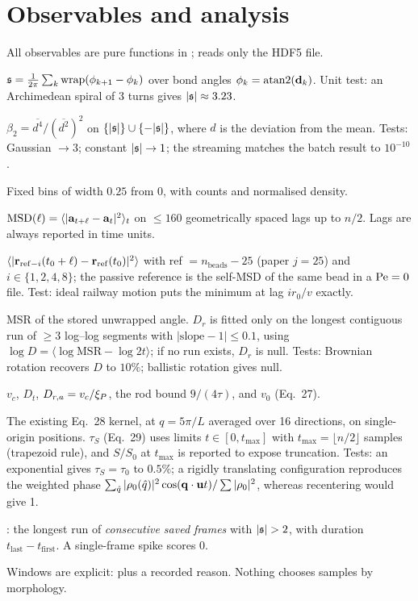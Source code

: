 \documentclass[11pt]{article}
\begin{document}
\section{Observables and analysis}\label{sec:observables}
All observables are pure functions in ;  reads only the HDF5 file.
\begin{description}[style=nextline]
\item[Spiral number] $\mathfrak{s}=\frac1{2\pi}\sum_k\mathrm{wrap}(\phi_{k+1}-\phi_k)$ over bond angles $\phi_k=\operatorname{atan2}(\mathbf{d}_k)$. Unit test: an Archimedean spiral of 3 turns gives $|\mathfrak{s}|\approx3.23$.
\item[Symmetrized kurtosis] $\beta_2=\overline{d^4}/(\overline{d^2})^2$ on $\{|\mathfrak{s}|\}\cup\{-|\mathfrak{s}|\}$, where $d$ is the deviation from the mean. Tests: Gaussian $\to3$; constant $|\mathfrak{s}|\to1$; the streaming  matches the batch result to $10^{-10}$.
\item[$|\spn|$ histogram] Fixed bins of width $0.25$ from 0, with counts and normalised density.
\item[Multi-origin MSD] $\mathrm{MSD}(\ell)=\langle|\mathbf{a}_{t+\ell}-\mathbf{a}_t|^2\rangle_t$ on $\leq160$ geometrically spaced lags up to $n/2$. Lags are always reported in time units.
\item[Railway MSD] $\langle|\mathbf{r}_{\mathrm{ref}-i}(t_0+\ell)-\mathbf{r}_\mathrm{ref}(t_0)|^2\rangle$ with ref $=n_\mathrm{beads}-25$ (paper $j=25$) and $i\in\{1,2,4,8\}$; the passive reference is the self-MSD of the same bead in a $\mathrm{Pe}=0$ file. Test: ideal railway motion puts the minimum at lag $ir_0/v$ exactly.
\item[MSR and $D_r$] MSR of the stored unwrapped angle. $D_r$ is fitted only on the longest contiguous run of $\geq3$ log--log segments with $|\mathrm{slope}-1|\leq0.1$, using $\log D=\langle\log\mathrm{MSR}-\log2t\rangle$; if no run exists, $D_r$ is null. Tests: Brownian rotation recovers $D$ to $10\%$; ballistic rotation gives null.
\item[Comparison values (not fit targets)] $v_c$, $D_t$, $D_{r,a}=v_c/\xi_{P}$, the rod bound $9/(4\tau)$, and $v_0$ (Eq.~27).
\item[$S(q,t)$ and $\tau_S$] The existing Eq.~28 kernel, at $q=5\pi/L$ averaged over 16 directions, on single-origin positions. $\tau_S$ (Eq.~29) uses limits $t\in[0,t_\mathrm{max}]$ with $t_\mathrm{max}=\lfloor n/2\rfloor$ samples (trapezoid rule), and $S/S_0$ at $t_\mathrm{max}$ is reported to expose truncation. Tests: an exponential gives $\tau_S=\tau_0$ to $0.5\%$; a rigidly translating configuration reproduces the weighted phase $\sum_{\hat q}|\rho_0(\hat q)|^2\cos(\mathbf{q}\cdot\mathbf{u} t)/\sum|\rho_0|^2$, whereas recentering would give 1.
\item[Plateau rule] : the longest run of \emph{consecutive saved frames} with $|\spn|>2$, with duration $t_\mathrm{last}-t_\mathrm{first}$. A single-frame spike scores 0.
\end{description}
Windows are explicit:  plus a recorded reason. Nothing chooses samples by morphology.
\end{document}
